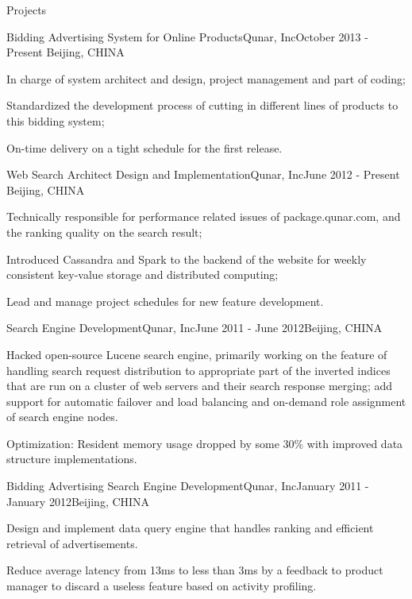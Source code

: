 \documentclass{resume} %
\begin{document}
\begin{rSection}{Projects}

\begin{rSubsection}{Bidding Advertising System for Online Products}{Qunar, Inc}{October 2013 - Present}
{Beijing, CHINA}
\item In charge of system architect and design, project management and part of coding;
\item Standardized the development process of cutting in different lines of products to this bidding system;
\item On-time delivery on a tight schedule for the first release.
\end{rSubsection}

\begin{rSubsection}{Web Search Architect Design and Implementation}{Qunar, Inc}{June 2012 - Present}
{Beijing, CHINA}
\item Technically responsible for performance related issues of package.qunar.com, and the ranking quality on the search result;
\item Introduced Cassandra and Spark to the backend of the website for weekly consistent key-value storage and distributed
 computing;
\item Lead and manage project schedules for new feature development.

\end{rSubsection}

\begin{rSubsection}{Search Engine Development}{Qunar, Inc}{June 2011 -
    June 2012}{Beijing, CHINA}
\item Hacked open-source Lucene search engine, primarily working on the feature of handling search
request distribution to appropriate part of the inverted indices that are run on a cluster of web servers and their
search response merging; add support for automatic failover and load balancing and on-demand role
assignment of search engine nodes.
\item Optimization: Resident memory usage dropped by some 30\% with improved data structure implementations.
\end{rSubsection}

\begin{rSubsection}{Bidding Advertising Search Engine
    Development}{Qunar, Inc}{January 2011 -
    January 2012}{Beijing, CHINA}
\item Design and implement data query engine that handles ranking and efficient retrieval of advertisements.
\item Reduce average latency from 13ms to less than 3ms by a feedback to product manager to discard a useless 
feature based on activity profiling. 
\end{rSubsection}

\end{rSection}
\end{document}
